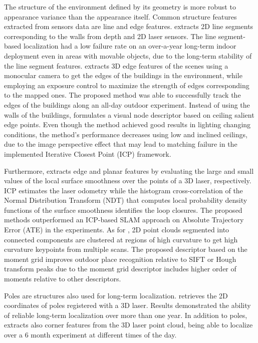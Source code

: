 The structure of the environment defined by its geometry is more robust to appearance variance than the appearance itself. Common structure features extracted from sensors data are line and edge features.
\cite{biswas-veloso:2013:0278364913503892} extracts 2D line segments corresponding to the walls from depth and 2D laser sensors. The line segment-based localization had a low failure rate on an over-a-year long-term indoor deployment even in areas with movable objects, due to the long-term stability of the line segment features.
\cite{nuske-et-al:2009:20306} extracts 3D edge features of the scenes using a monocular camera to get the edges of the buildings in the environment, while employing an exposure control to maximize the strength of edges corresponding to the mapped ones. The proposed method was able to successfully track the edges of the buildings along an all-day outdoor experiment.
Instead of using the walls of the buildings, \cite{an-et-al:2016:0} formulates a visual node descriptor based on ceiling salient edge points. Even though the method achieved good results in lighting changing conditions, the method's performance decreases using low and inclined ceilings, due to the image perspective effect that may lead to matching failure in the implemented Iterative Closest Point (ICP) framework.

Furthermore, \cite{meng-et-al:2021:3062647} extracts edge and planar features by evaluating the large and small values of the local surface smoothness over the points of a 3D laser, respectively. ICP estimates the laser odometry while the histogram cross-correlation of the Normal Distribution Transform (NDT) that computes local probability density functions of the surface smoothness identifies the loop closures.
The proposed methods outperformed an ICP-based SLAM approach on Absolute Trajectory Error (ATE) in the experiments.
As for \cite{bosse-zlot:2009:009}, 2D point clouds segmented into connected components are clustered at regions of high curvature to get high curvature keypoints from multiple scans.
The proposed descriptor based on the moment grid improves outdoor place recognition relative to SIFT or Hough transform peaks due to the moment grid descriptor includes higher order of moments relative to other descriptors.

Poles are structures also used for long-term localization.
\cite{schaefer-et-al:2021:103709} retrieves the 2D coordinates of poles registered with a 3D laser. Results demonstrated the ability of reliable long-term localization over more than one year.
In addition to poles, \cite{berrio-et-al:2019:8814289} extracts also corner features from the 3D laser point cloud, being able to localize over a 6 month experiment at different times of the day.

